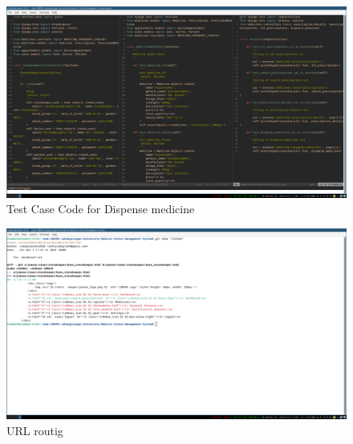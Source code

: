 \documentclass[a4paper,12pt]{article}
\begin{document}
\begin{figure}[H]
    \centering
    \includegraphics[width=1\textwidth]{images/src2test.png}
    \caption{Test Case Code for Dispense medicine}
    \label{fig:testcodefordispensemedicine}
\end{figure}

\begin{figure}[H]
    \centering
    \includegraphics[width=1\textwidth]{images/scr3url.png}
    \caption{URL routig}
    \label{fig:urlrouting}
\end{figure}
\end{document}
